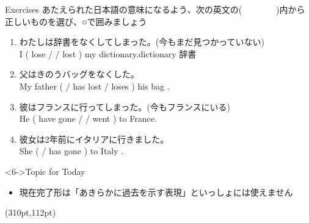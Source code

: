 \documentclass[aspectratio=169,xcolor={dvipsnames,table}]{beamer}
\newcommand{\myaudio}[1]{\href{#1}{\faVolumeUp}}
\begin{document}
\begin{frame}[plain]{Exercises}
 あたえられた日本語の意味になるよう、次の英文の(~~~~~~~~)内から正しいものを選び、○で囲みましょう%
\mbox{}\hfill{\scriptsize \myaudio{./audio/014_have_pp_kekka_05.mp3}}


\begin{enumerate}
 \item {\small わたしは辞書をなくしてしまった。}{\footnotesize (今もまだ見つかっていない)}\\
I  ( lose /  / lost ) my dictionary.\hfill{\scriptsize dictionary  辞書}
 \item {\small 父はきのうバッグをなくした。\textdbend}\\
My father (  / has lost / loses ) his bag .
 \item {\small 彼はフランスに行ってしまった。}{\footnotesize (今もフランスにいる)}\\
He ( have gone /  / went  ) to France.
 \item {\small 彼女は2年前にイタリアに行きました。\textdbend}\\
She (  / has gone ) to Italy .
\end{enumerate}

\begin{block}<6->{Topic for Today}\small
 \begin{itemize}[square]\small
 \item 現在完了形は「あきらかに過去を示す表現」といっしょには使えません\,\,\,\,\raisebox{-7pt}{\textdbend}
 \end{itemize}
\end{block}

\normalsize
\begin{textblock*}{0.4\linewidth}(310pt,112pt)
\end{textblock*}
\end{frame}
\end{document}
